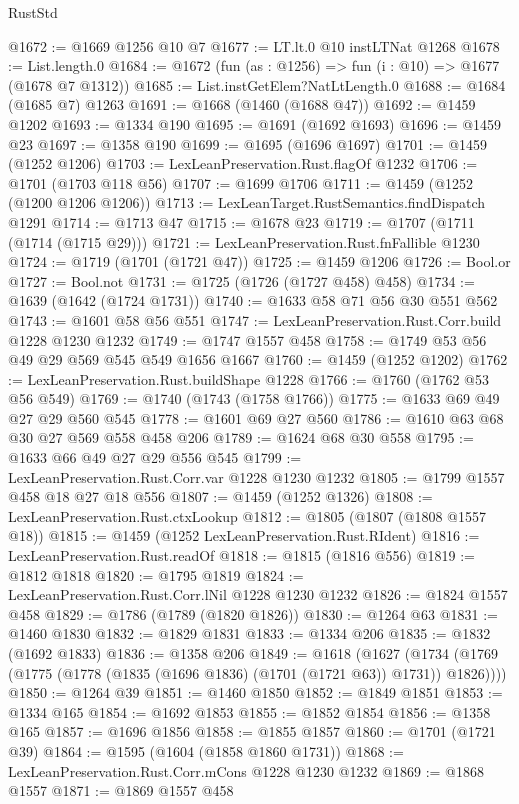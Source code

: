 \begin{lexlean}{RustStd}
\begin{coremodule}
{\begin{coremodule}
{{{{{{{{{{{{{@1672 := @1669 @1256 @10 @7
@1677 := LT.lt.{0} @10 instLTNat @1268
@1678 := List.length.{0}
@1684 := @1672 (fun (as : @1256) => fun (i : @10) => @1677 (@1678 @7 @1312))
@1685 := List.instGetElem?NatLtLength.{0}
@1688 := @1684 (@1685 @7) @1263
@1691 := @1668 (@1460 (@1688 @47))
@1692 := @1459 @1202
@1693 := @1334 @190
@1695 := @1691 (@1692 @1693)
@1696 := @1459 @23
@1697 := @1358 @190
@1699 := @1695 (@1696 @1697)
@1701 := @1459 (@1252 @1206)
@1703 := LexLeanPreservation.Rust.flagOf @1232
@1706 := @1701 (@1703 @118 @56)
@1707 := @1699 @1706
@1711 := @1459 (@1252 (@1200 @1206 @1206))
@1713 := LexLeanTarget.RustSemantics.findDispatch @1291
@1714 := @1713 @47
@1715 := @1678 @23
@1719 := @1707 (@1711 (@1714 (@1715 @29)))
@1721 := LexLeanPreservation.Rust.fnFallible @1230
@1724 := @1719 (@1701 (@1721 @47))
@1725 := @1459 @1206
@1726 := Bool.or
@1727 := Bool.not
@1731 := @1725 (@1726 (@1727 @458) @458)
@1734 := @1639 (@1642 (@1724 @1731))
@1740 := @1633 @58 @71 @56 @30 @551 @562
@1743 := @1601 @58 @56 @551
@1747 := LexLeanPreservation.Rust.Corr.build @1228 @1230 @1232
@1749 := @1747 @1557 @458
@1758 := @1749 @53 @56 @49 @29 @569 @545 @549 @1656 @1667
@1760 := @1459 (@1252 @1202)
@1762 := LexLeanPreservation.Rust.buildShape @1228
@1766 := @1760 (@1762 @53 @56 @549)
@1769 := @1740 (@1743 (@1758 @1766))
@1775 := @1633 @69 @49 @27 @29 @560 @545
@1778 := @1601 @69 @27 @560
@1786 := @1610 @63 @68 @30 @27 @569 @558 @458 @206
@1789 := @1624 @68 @30 @558
@1795 := @1633 @66 @49 @27 @29 @556 @545
@1799 := LexLeanPreservation.Rust.Corr.var @1228 @1230 @1232
@1805 := @1799 @1557 @458 @18 @27 @18 @556
@1807 := @1459 (@1252 @1326)
@1808 := LexLeanPreservation.Rust.ctxLookup
@1812 := @1805 (@1807 (@1808 @1557 @18))
@1815 := @1459 (@1252 LexLeanPreservation.Rust.RIdent)
@1816 := LexLeanPreservation.Rust.readOf
@1818 := @1815 (@1816 @556)
@1819 := @1812 @1818
@1820 := @1795 @1819
@1824 := LexLeanPreservation.Rust.Corr.lNil @1228 @1230 @1232
@1826 := @1824 @1557 @458
@1829 := @1786 (@1789 (@1820 @1826))
@1830 := @1264 @63
@1831 := @1460 @1830
@1832 := @1829 @1831
@1833 := @1334 @206
@1835 := @1832 (@1692 @1833)
@1836 := @1358 @206
@1849 := @1618
    (@1627 (@1734 (@1769 (@1775 (@1778 (@1835 (@1696 @1836) (@1701 (@1721 @63)) @1731)) @1826))))
@1850 := @1264 @39
@1851 := @1460 @1850
@1852 := @1849 @1851
@1853 := @1334 @165
@1854 := @1692 @1853
@1855 := @1852 @1854
@1856 := @1358 @165
@1857 := @1696 @1856
@1858 := @1855 @1857
@1860 := @1701 (@1721 @39)
@1864 := @1595 (@1604 (@1858 @1860 @1731))
@1868 := LexLeanPreservation.Rust.Corr.mCons @1228 @1230 @1232
@1869 := @1868 @1557
@1871 := @1869 @1557 @458
}}}}}}}}}}}}}
\end{coremodule}}
\end{coremodule}
\end{lexlean}
